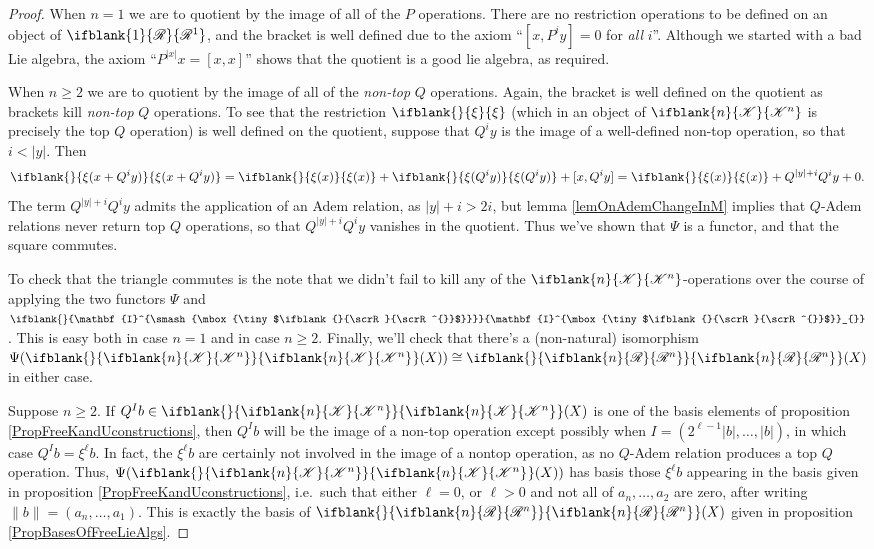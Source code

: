 \documentclass[10pt]{article}
\newcommand{\PRLie}[1]%
{\ifblank{#1}{\scrR}{\scrR^{#1}}}
\newcommand{\LL}[1]{\ifblank{#1}{\scrK}{\scrK^{#1}}}
\newcommand{\iteratedrestn}[2]{\xi^{#2}{#1}}
\newcommand{\Ind}[2][]{\ifblank{#1}{\mathbf{I}^{\smash{\mbox{\tiny $#2$}}}}{\mathbf{I}^{\mbox{\tiny $#2$}}_{#1}}}%
\newcommand{\Fr}[2][]{\ifblank{#1}{#2}{#2_{#1}}}
\newcommand{\restn}[2][]{\ifblank{#1}{\xi{#2}}{\xi_{#1}{#2}}}%
\renewcommand{\Q}{Q}
\begin{document}
\begin{DiagramOfFunctors}
\begin{proof}
When $n=1$ we are to quotient by the image of all of the $P$ operations. There are no restriction operations to be defined on an object of $\PRLie{1}$, and the bracket is well defined due to the axiom ``$[x,P^iy]=0$ for \emph{all} $i$''. Although we started with a bad Lie algebra, the axiom ``$P^{|x|}x=[x,x]$'' shows that the quotient is a good lie algebra, as required.

When $n\geq2$  we are to quotient by the image of all of the \emph{non-top} $\Q$ operations. Again, the bracket is well defined on the quotient as brackets kill \emph{non-top} $\Q$ operations. To see that the restriction $\restn{}$ (which in an object of $\LL{n}$ is precisely the top $\Q$ operation) is well defined on the quotient, %
suppose that $\Q^iy$ is the image of a well-defined non-top operation, so that $i<|y|$. Then
\[\restn{(x+\Q^iy)}=\restn{(x)}+\restn{(\Q^iy)}+[x,\Q^iy]=\restn{(x)}+\Q^{|y|+i}\Q^iy+0.\]
The term $\Q^{|y|+i}\Q^iy$ admits the application of an Adem relation, as $|y|+i>2i$, but lemma \ref{lemOnAdemChangeInM} implies that $\Q$-Adem relations never return top $\Q$ operations, so that $\Q^{|y|+i}\Q^iy$ vanishes in the quotient. Thus we've shown that $\Psi$ is a functor, and that the square commutes.

To check that the triangle commutes is the note that we didn't fail to kill any of the $\LL{n}$-operations over the course of applying the two functors $\Psi$ and $\Ind{\PRLie{}}$. This is easy both in case $n=1$ and in case $n\geq2$. Finally, we'll check that there's a (non-natural) isomorphism $\Psi(\Fr{\LL{n}}(X))\cong\Fr{\PRLie{n}}(X)$ in either case.

Suppose $n\geq2$. If $Q^Ib\in\Fr{\LL{n}}(X)$ is one of the basis elements of proposition \ref{PropFreeKandUconstructions}, then $\Q^Ib$ will be the image of a non-top operation except possibly when $I=(2^{\ell-1}|b|,\ldots,|b|)$, in which case $\Q^Ib=\iteratedrestn{b}{\ell}$. In fact, the $\iteratedrestn{b}{\ell}$ are certainly not involved in the image of a nontop operation, as no $\Q$-Adem relation produces a top $\Q$ operation. Thus, $\Psi(\Fr{\LL{n}}(X))$ has basis those $\iteratedrestn{b}{\ell}$ appearing in the basis given in proposition \ref{PropFreeKandUconstructions}, i.e.\ such that either $\ell=0$, or $\ell>0$ and not all of $a_n,\ldots,a_2$ are zero, after writing $\|b\|=(a_n,\ldots,a_1)$. This is exactly the basis of $\Fr{\PRLie{n}}(X)$ given in proposition \ref{PropBasesOfFreeLieAlgs}.


\end{proof}
\end{DiagramOfFunctors}
\end{document}
